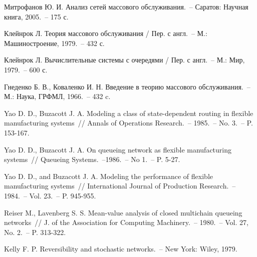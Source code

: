 \begin{thebibliography}{9}

 Митрофанов Ю. И. Анализ сетей массового обслуживания.~-- Саратов: Научная книга, 2005.~-- 175 с.

 Клейнрок Л. Теория массового обслуживания / Пер. с англ.~-- М.: Машиностроение, 1979.~-- 432 с.

 Клейнрок Л. Вычислительные системы с очередями / Пер. с англ.~-- М.: Мир, 1979.~-- 600 с.

 Гнеденко Б. В., Коваленко И. Н. Введение в теорию массового обслуживания.~-- М.: Наука, ГРФМЛ, 1966.~-- 432 c.

 Yao D. D., Buzacott J. A. Modeling a class of state-dependent routing in flexible manufacturing systems~// Annals of Operations Research.~-- 1985.~-- No. 3.~-- P. 153-167.

 Yao D. D., Buzacott J. A. On queueing network as flexible manufacturing systems~// Queueing Systems.~--1986.~-- No 1.~-- P. 5-27.

 Yao D. D., and Buzacott J. A. Modeling the performance of flexible manufacturing systems~// International Journal of Production Research.~--1984.~-- Vol. 23.~-- P. 945-955.

 Reiser M., Lavenberg S. S. Mean-value analysis of closed multichain queueing networks~// J. of the Association for Computing Machinery.~-- 1980.~-- Vol. 27, No. 2.~-- P. 313-322.

 Kelly F. P. Reversibility and stochastic networks.~-- New York: Wiley, 1979.

\end{thebibliography}

